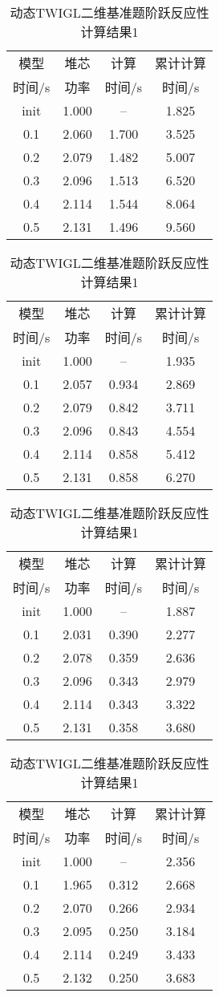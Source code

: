 \begin{table}
\centering
\caption{动态TWIGL二维基准题阶跃反应性计算结果1\label{tab:testresult.twigl.1.1-2}}
{
\small
\begin{tabular}{cccc}
\toprule
模型 & 堆芯 & 计算 & 累计计算\\
时间/s & 功率 & 时间/s & 时间/s\\
\midrule
init & 1.000 & -- & 1.825\\
0.1 & 2.060 & 1.700 & 3.525\\
0.2 & 2.079 & 1.482 & 5.007\\
0.3 & 2.096 & 1.513 & 6.520\\
0.4 & 2.114 & 1.544 & 8.064\\
0.5 & 2.131 & 1.496 & 9.560\\
\bottomrule
\end{tabular}
}
{
\small
\begin{tabular}{cccc}
\toprule
模型 & 堆芯 & 计算 & 累计计算\\
时间/s & 功率 & 时间/s & 时间/s\\
\midrule
init & 1.000 & -- & 1.935\\
0.1 & 2.057 & 0.934 & 2.869\\
0.2 & 2.079 & 0.842 & 3.711\\
0.3 & 2.096 & 0.843 & 4.554\\
0.4 & 2.114 & 0.858 & 5.412\\
0.5 & 2.131 & 0.858 & 6.270\\
\bottomrule
\end{tabular}
}

{
\small
\begin{tabular}{cccc}
\toprule
模型 & 堆芯 & 计算 & 累计计算\\
时间/s & 功率 & 时间/s & 时间/s\\
\midrule
init & 1.000 & -- & 1.887\\
0.1 & 2.031 & 0.390 & 2.277\\
0.2 & 2.078 & 0.359 & 2.636\\
0.3 & 2.096 & 0.343 & 2.979\\
0.4 & 2.114 & 0.343 & 3.322\\
0.5 & 2.131 & 0.358 & 3.680\\
\bottomrule
\end{tabular}
}
{
\small
\begin{tabular}{cccc}
\toprule
模型 & 堆芯 & 计算 & 累计计算\\
时间/s & 功率 & 时间/s & 时间/s\\
\midrule
init & 1.000 & -- & 2.356\\
0.1 & 1.965 & 0.312 & 2.668\\
0.2 & 2.070 & 0.266 & 2.934\\
0.3 & 2.095 & 0.250 & 3.184\\
0.4 & 2.114 & 0.249 & 3.433\\
0.5 & 2.132 & 0.250 & 3.683\\
\bottomrule
\end{tabular}
}



\end{table}
